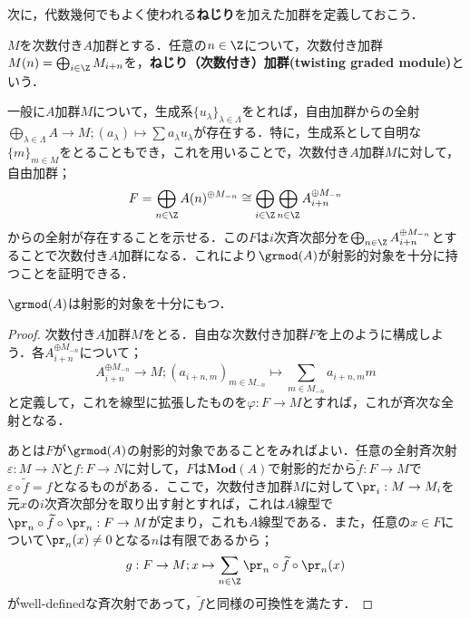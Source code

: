 次に，代数幾何でもよく使われる\textbf{ねじり}を加えた加群を定義しておこう．

\begin{defi}[ねじり加群]
	$M$を次数付き$A$加群とする．任意の$n\in\Z$について，次数付き加群$M(n)=\bigoplus_{i\in\Z}M_{i+n}$を，\textbf{ねじり（次数付き）加群(twisting graded module)}という．
\end{defi}

一般に$A$加群$M$について，生成系$\{u_\lambda\}_{\lambda\in\Lambda}$をとれば，自由加群からの全射$\bigoplus_{\lambda\in\Lambda}A\to M;(a_\lambda)\mapsto \sum a_\lambda u_\lambda$が存在する．特に，生成系として自明な$\{m\}_{m\in M}$をとることもでき，これを用いることで，次数付き$A$加群$M$に対して，自由加群；
\[F=\bigoplus_{n\in\Z}A(n)^{\oplus M_{-n}}\cong\bigoplus_{i\in\Z}\bigoplus_{n\in\Z}A_{i+n}^{\oplus M_{-n}}\]
からの全射が存在することを示せる．この$F$は$i$次斉次部分を$\bigoplus_{n\in\Z}A_{i+n}^{\oplus M_{-n}}$とすることで次数付き$A$加群になる．これにより$\grmod(A)$が射影的対象を十分に持つことを証明できる．

\begin{thm}
	$\grmod(A)$は射影的対象を十分にもつ．
\end{thm}
\begin{proof}
	次数付き$A$加群$M$をとる．自由な次数付き加群$F$を上のように構成しよう．各$A_{i+n}^{\oplus M_{-n}}$について；
	\[A_{i+n}^{\oplus M_{-n}}\to M;(a_{i+n,m})_{m\in M_{-n}}\mapsto\sum_{m\in M_{-n}}a_{i+n,m}m\]
	と定義して，これを線型に拡張したものを$\varphi:F\to M$とすれば，これが斉次な全射となる．
	
	あとは$F$が$\grmod(A)$の射影的対象であることをみればよい．任意の全射斉次射$\varepsilon:M\to N$と$f:F\to N$に対して，$F$は$\mathbf{Mod}(A)$で射影的だから$\widetilde{f}:F\to M$で$\varepsilon\circ\widetilde{f}=f$となるものがある．ここで，次数付き加群$M$に対して$\pr_i:M\to M_i$を元$x$の$i$次斉次部分を取り出す射とすれば，これは$A$線型で$\pr_n\circ\widetilde{f}\circ\pr_n:F\to M$が定まり，これも$A$線型である．また，任意の$x\in F$について$\pr_n(x)\neq0$となる$n$は有限であるから；
	\[g:F\to M;x\mapsto\sum_{n\in\Z}\pr_n\circ\widetilde{f}\circ\pr_n(x)\]
	がwell-definedな斉次射であって，$\widetilde{f}$と同様の可換性を満たす．
\end{proof}

